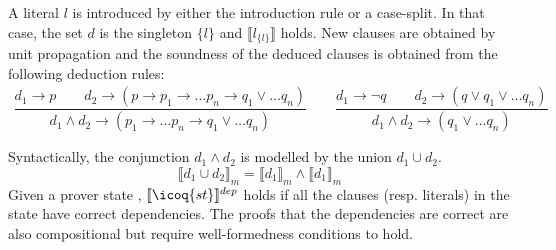 \documentclass[utf8,a4paper,UKenglish,cleveref, autoref, thm-restate]{lipics-v2019}
\begin{document}
A literal $l$ is introduced by either the introduction rule or a
case-split. In that case, the set $d$ is the singleton $\{l\}$ and
$\llbracket l_{\{l \}} \rrbracket$ holds. New clauses are obtained by
unit propagation and the soundness of the deduced clauses is obtained
from the following deduction rules:
\[
  \begin{array}{c}
  \dfrac{ d_1 \to p  \qquad d_2 \to (p \to p_1 \to \dots p_n \to q_1 \lor \dots q_n) }
    {d_1 \land d_2 \to (p_1 \to \dots p_n \to q_1 \lor \dots q_n) } \qquad
  \dfrac{ d_1 \to \neg q  \qquad d_2 \to (q \lor q_1 \lor \dots q_n) }
    {d_1 \land d_2 \to (q_1 \lor \dots q_n) }\\\\
  \end{array}
\]
Syntactically, the conjunction $d_1 \land d_2$ is modelled by the union $d_1 \cup d_2$.
\[
  \llbracket d_1 \cup d_2 \rrbracket_m = \llbracket d_1 \rrbracket_m \land \llbracket d_1 \rrbracket_m
\]
Given a prover state ,
$\llbracket \icoq{st} \rrbracket^{dep}$ holds if all the clauses
(resp. literals) in the state have correct dependencies.  The proofs that the
dependencies are correct are also compositional but require
well-formedness conditions to hold.
\end{document}
